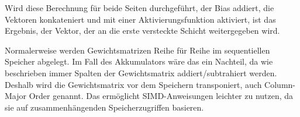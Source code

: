 Wird diese Berechnung für beide Seiten durchgeführt, der Bias addiert, die Vektoren konkateniert und mit einer Aktivierungsfunktion aktiviert, ist das Ergebnis, der Vektor, der an die erste versteckte Schicht weitergegeben wird.

Normalerweise werden Gewichtsmatrizen Reihe für Reihe im sequentiellen Speicher abgelegt. Im Fall des Akkumulators wäre das ein Nachteil, da wie beschrieben immer Spalten der Gewichtsmatrix addiert/subtrahiert werden. Deshalb wird die Gewichtsmatrix vor dem Speichern transponiert, auch Column-Major Order genannt. Das ermöglicht \ac{SIMD}-Anweisungen leichter zu nutzen, da sie auf zusammenhängenden Speicherzugriffen basieren.